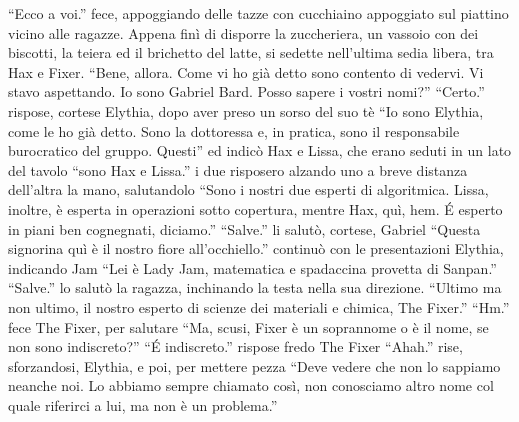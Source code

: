     ``Ecco a voi.'' fece, appoggiando delle tazze con cucchiaino appoggiato
    sul piattino vicino alle ragazze. Appena finì di disporre la
    zuccheriera, un vassoio con dei biscotti, la teiera ed il brichetto del
    latte, si sedette nell'ultima sedia libera, tra Hax e Fixer. ``Bene,
    allora. Come vi ho già detto sono contento di vedervi. Vi stavo
    aspettando. Io sono Gabriel Bard. Posso sapere i vostri nomi?''
    ``Certo.'' rispose, cortese Elythia, dopo aver preso un sorso del suo
    tè ``Io sono Elythia, come le ho già detto. Sono la dottoressa e, in
    pratica, sono il responsabile burocratico del gruppo. Questi'' ed
    indicò Hax e Lissa, che erano seduti in un lato del tavolo ``sono Hax e
    Lissa.'' i due risposero alzando uno a breve distanza dell'altra la
    mano, salutandolo ``Sono i nostri due esperti di algoritmica. Lissa, inoltre, è
    esperta in operazioni sotto copertura, mentre Hax, quì, hem. \'E
    esperto in piani ben cognegnati, diciamo.'' ``Salve.'' li salutò,
    cortese, Gabriel ``Questa signorina quì è il nostro fiore
    all'occhiello.'' continuò con le presentazioni Elythia, indicando Jam
    ``Lei è Lady Jam, matematica e spadaccina provetta di Sanpan.''
    ``Salve.'' lo salutò la ragazza, inchinando la testa nella sua
    direzione. ``Ultimo ma non ultimo, il nostro esperto di scienze dei
    materiali e chimica, The Fixer.'' ``Hm.'' fece The Fixer, per salutare
    ``Ma, scusi, Fixer è un soprannome o è il nome, se non sono
    indiscreto?'' ``\'E indiscreto.'' rispose fredo The Fixer ``Ahah.''
    rise, sforzandosi, Elythia, e poi, per mettere pezza ``Deve
    vedere che non lo sappiamo neanche noi. Lo abbiamo sempre chiamato
    così, non conosciamo altro nome col quale riferirci a lui, ma non è un
    problema.''

